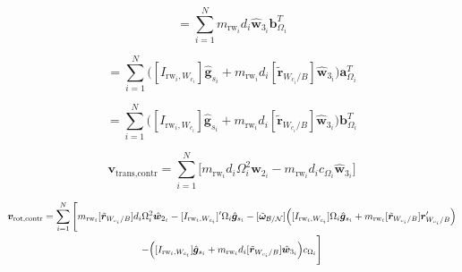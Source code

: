 \documentclass[]{BasiliskReportMemo}
\begin{document}
\begin{equation}
[B_\text{contr}] = \sum\limits_{i=1}^{N}m_{\text{rw}_i}d_i\hat{\bm{w}}_{3_i} \bm{b}_{\Omega_i}^T
\end{equation}

\begin{equation}
[C_\text{contr}] = \sum\limits_{i=1}^{N}\Big([I_{\text{rw}_i,W_{c_i}}]\hat{\bm{g}}_{s_i} + m_{\text{rw}_i}d_i[\tilde{\bm{r}}_{W_{c_i}/B}]\hat{\bm{w}}_{3_i}\Big)\bm{a}_{\Omega_i}^T
\end{equation}

\begin{equation}
[D_\text{contr}] = \sum\limits_{i=1}^{N}\Big([I_{\text{rw}_i,W_{c_i}}]\hat{\bm{g}}_{s_i} + m_{\text{rw}_i}d_i[\tilde{\bm{r}}_{W_{c_i}/B}]\hat{\bm{w}}_{3_i}\Big)\bm{b}_{\Omega_i}^T
\end{equation}

\begin{equation}
\bm{v}_\text{trans,contr} = \sum\limits_{i=1}^{N}\Bigg[ m_{\text{rw}_i}d_i\Omega_i^2\hat{\bm{w}}_{2_i} -m_{\text{rw}_i}d_i c_{\Omega_i}\hat{\bm{w}}_{3_i} \Bigg]
\end{equation}

\begin{multline}
\bm{v}_\text{rot,contr} = \sum\limits_{i=1}^{N}\Bigg[ m_{\text{rw}_i}[\tilde{\bm{r}}_{W_{c_i}/B}]d_i \Omega_i^2\hat{\bm{w}}_{2_i}-[I_{\text{rw}_i,W_{c_i}}]'\Omega_i \hat{\bm{g}}_{s_i} -[\tilde{\bm\omega}_{\cal B/N}]\Big([I_{\text{rw}_i,W_{c_i}}]\Omega_i \hat{\bm{g}}_{s_i}+ m_{\text{rw}_i}[\tilde{\bm{r}}_{W_{c_i}/B}]\bm{r}'_{W_{c_i}/B}\Big)
\\-\Big([I_{\text{rw}_i,W_{c_i}}]\hat{\bm{g}}_{s_i} + m_{\text{rw}_i}d_i[\tilde{\bm{r}}_{W_{c_i}/B}]\hat{\bm{w}}_{3_i}\Big)c_{\Omega_i}\Bigg]
\end{multline}
\end{document}
